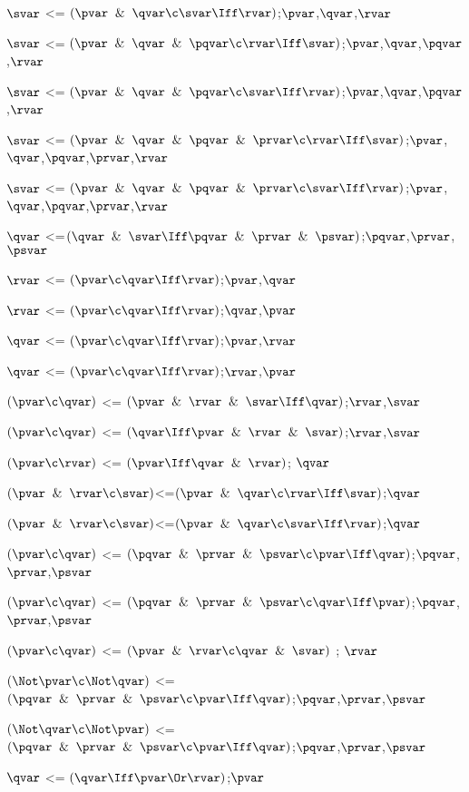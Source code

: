 $\svar$ <= $(\pvar \And \qvar \c \svar \Iff \rvar)$;$\pvar$,$\qvar$,$\rvar$

$\svar$ <= $(\pvar \And \qvar \And \pqvar \c \rvar \Iff \svar)$;$\pvar$,$\qvar$,$\pqvar$,$\rvar$

$\svar$ <= $(\pvar \And \qvar \And \pqvar \c \svar \Iff \rvar)$;$\pvar$,$\qvar$,$\pqvar$,$\rvar$

$\svar$ <= $(\pvar \And \qvar \And \pqvar\And \prvar \c \rvar \Iff \svar)$;$\pvar$,$\qvar$,$\pqvar$,$\prvar$,$\rvar$

$\svar$ <= $(\pvar \And \qvar \And \pqvar \And\prvar\c \svar \Iff \rvar)$;$\pvar$,$\qvar$,$\pqvar$,$\prvar$,$\rvar$

$\qvar$ <=$(\qvar \And \svar \Iff \pqvar \And \prvar \And \psvar)$;$\pqvar$,$\prvar$,$\psvar$

$\rvar$ <=  $(\pvar \c \qvar \Iff \rvar)$;$\pvar$,$\qvar$

$\rvar$ <=  $(\pvar \c \qvar \Iff \rvar)$;$\qvar$,$\pvar$

$\qvar$ <=  $(\pvar \c \qvar \Iff \rvar)$;$\pvar$,$\rvar$

$\qvar$ <=  $(\pvar \c \qvar \Iff \rvar)$;$\rvar$,$\pvar$

$(\pvar \c \qvar )$ <= $(\pvar \And\rvar \And \svar\Iff \qvar)$;$\rvar$,$\svar$ 

$(\pvar \c \qvar )$ <= $(\qvar \Iff \pvar \And\rvar \And \svar)$;$\rvar$,$\svar$ 

$(\pvar  \c \rvar)$ <= $(\pvar \Iff \qvar \And \rvar)$; $\qvar$

$(\pvar \And \rvar\c \svar)$<=$(\pvar \And \qvar \c \rvar \Iff \svar)$;$\qvar$

$(\pvar \And \rvar\c \svar)$<=$(\pvar \And \qvar \c \svar \Iff \rvar)$;$\qvar$

$(\pvar \c \qvar)$ <= $(\pqvar \And \prvar \And \psvar \c \pvar \Iff \qvar)$;$\pqvar$,$\prvar$,$\psvar$

$(\pvar \c \qvar)$ <= $(\pqvar \And \prvar \And \psvar \c \qvar \Iff \pvar)$;$\pqvar$,$\prvar$,$\psvar$

$(\pvar \c \qvar)$ <= $(\pvar \And \rvar \c \qvar \And \svar)$ ; $\rvar$

$(\Not\pvar \c \Not\qvar)$ <= $(\pqvar \And \prvar \And \psvar \c \pvar \Iff \qvar)$;$\pqvar$,$\prvar$,$\psvar$ 

$(\Not\qvar \c \Not\pvar)$ <= $(\pqvar \And \prvar \And \psvar \c \pvar \Iff \qvar)$;$\pqvar$,$\prvar$,$\psvar$ 

$\qvar$ <= $(\qvar \Iff \pvar \Or \rvar)$;$\pvar$


